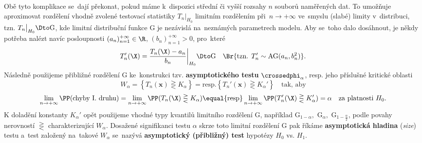 Obě tyto komplikace se~dají překonat, pokud máme k~dispozici střední či vyšší rozsahy $n$ souborů naměřených dat. To umožňuje aproximovat rozdělení vhodně zvolené testovací statistiky $T_n\big|_{H_0}$ limitním rozdělením při~$n\to+\infty$ ve~smyslu (slabé) limity v~distribuci, tzn. $T_n\big|_{H_0}\Dto \mathrm{G}$, kde limitní distribuční funkce $\mathrm{G}$ je nezávislá na~neznámých parametrech modelu. Aby se~toho dalo dosáhnout, je někdy potřeba nalézt navíc posloupnosti $(a_n)_{n=1}^{+\infty}\in\R$, $(b_n)_{n=1}^{+\infty}>0$, pro~které
$$ T_n'(\X)=\frac{T_n(\X)-a_n}{b_n}\bigg|_{H_0}\Dto \mathrm{G}\quad\Br{\text{tzn. }T_n'\sim\mathrm{A\mathrm{G}}(a_n,b_n^2)}. $$
Následně použijeme přibližné rozdělení $\mathrm{G}$ ke~konstrukci tzv. \textbf{asymptotického testu} $\crossedphi_\alpha$, resp. jeho příslušné kritické oblasti
$$ W_\alpha=\left\{ T_n(\textbf{x})\gtreqless K_\alpha \right\}\equal{\text{resp}.}\left\{ T_n'(\textbf{x})\gtreqless K_\alpha' \right\}\quad\text{tak, aby} $$
$$ \lim\limits_{n\to+\infty}\PP(\text{chyby I. druhu})=\lim\limits_{n\to+\infty}\PP(T_n(\X)\gtreqless K_\alpha)\equal{\text{resp}}\lim\limits_{n\to+\infty}\PP(T_n'(\X)\gtreqless K_\alpha' )=\alpha\quad\text{za platnosti }H_0. $$
K doladění konstanty $K_\alpha'$ opět použijeme vhodné typy kvantilů limitního rozdělení $\mathrm{G}$, například $\mathrm{G}_{1-\alpha},$ $\mathrm{G}_\alpha,$ $\mathrm{G}_{1-\frac{\alpha}{2}}$, podle povahy nerovností $\gtreqless$ charakterizující $W_\alpha$. Dosažené signifikanci testu $\alpha$ skrze toto limitní rozdělení $\mathrm{G}$ pak říkáme \textbf{asymptotická hladina} (\textit{size}) testu a~test založený na~takové $W_\alpha$ se~nazývá \textbf{asymptotický (přibližný) test} hypotézy $H_0$ vs. $H_1$.

